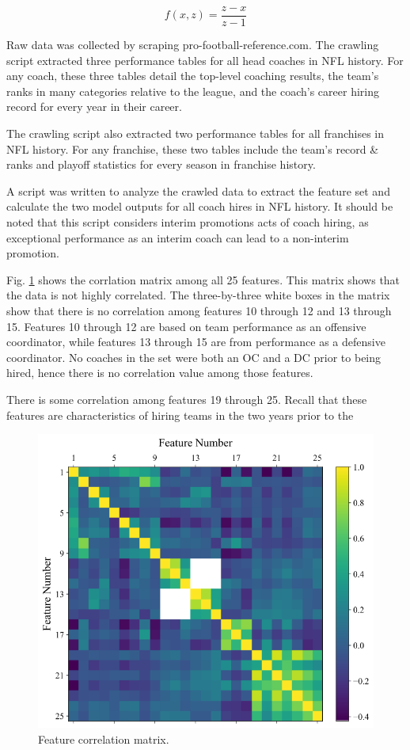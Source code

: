 \documentclass[conference]{IEEEtran}
\begin{document}
\begin{equation}
        f(x,z) = \frac{z-x}{z-1}
        \label{eq3}
\end{equation}

Raw data was collected by scraping pro-football-reference.com. The crawling script extracted three performance tables for all head coaches in NFL history. For any coach, these three tables detail the top-level coaching results, the team's ranks in many categories relative to the league, and the coach's career hiring record for every year in their career. 

The crawling script also extracted two performance tables for all franchises in NFL history. For any franchise, these two tables include the team's record \& ranks and playoff statistics for every season in franchise history.

A script was written to analyze the crawled data to extract the feature set and calculate the two model outputs for all coach hires in NFL history. It should be noted that this script considers interim promotions acts of coach hiring, as exceptional performance as an interim coach can lead to a non-interim promotion. 

Fig. \ref{fig1} shows the corrlation matrix among all 25 features. This matrix shows that the data is not highly correlated. The three-by-three white boxes in the matrix show that there is no correlation among features 10 through 12 and 13 through 15. Features 10 through 12 are based on team performance as an offensive coordinator, while features 13 through 15 are from performance as a defensive coordinator. No coaches in the set were both an OC and a DC prior to being hired, hence there is no correlation value among those features. 

There is some correlation among features 19 through 25. Recall that these features are characteristics of hiring teams in the two years prior to the 

\begin{figure}[htbp]
\centerline{\includegraphics[width=1\linewidth]{corr.png}}
\caption{Feature correlation matrix.}
\label{fig1}
\end{figure}
\end{document}
